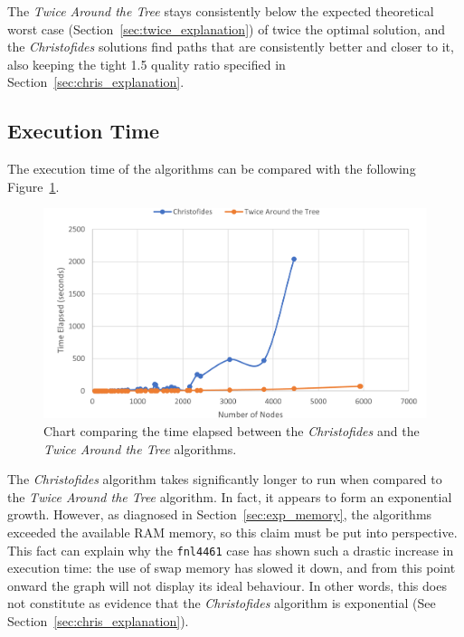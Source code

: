 \documentclass[12pt]{article}
\begin{document}
The \textit{Twice Around the Tree} stays consistently below the expected theoretical worst case (Section~\ref{sec:twice_explanation}) of 
twice the optimal solution, and the \textit{Christofides} solutions find paths that are consistently better and closer to it, 
also keeping the tight 1.5 quality ratio specified in Section~\ref{sec:chris_explanation}.

\subsection{Execution Time} \label{sec:exp_time}

The execution time of the algorithms can be compared with the following Figure~\ref{fig:exec_time}.

\begin{figure}[ht]
\centering
\includegraphics[height=.325\textheight]{images/execution_time_comparison.png}
\caption{Chart comparing the time elapsed between the \textit{Christofides} and the \textit{Twice Around the Tree} algorithms.}
\label{fig:exec_time}
\end{figure}

The \textit{Christofides} algorithm takes significantly longer to run when compared to the \textit{Twice Around the Tree} algorithm. 
In fact, it appears to form an exponential growth. However, as diagnosed in Section~\ref{sec:exp_memory}, the algorithms exceeded the available RAM memory, so this claim must be put into perspective.
This fact can explain why the \texttt{fnl4461} case has shown such a drastic increase in execution time: the use 
of swap memory has slowed it down, and from this point onward the graph will not display its ideal behaviour. In 
other words, this does not constitute as evidence that the \textit{Christofides} algorithm is exponential 
(See Section~\ref{sec:chris_explanation}).
\end{document}
